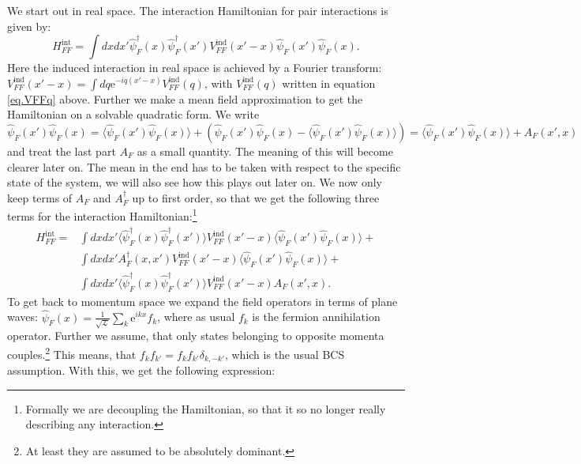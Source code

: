 We start out in real space. The interaction Hamiltonian for pair interactions is given by:
\begin{equation}
H^\text{int}_{FF} = \int dxdx' \hat{\psi}^\dagger_F(x)\hat{\psi}^\dagger_F(x')V^\text{ind}_{FF}(x'-x) \hat{\psi}_F(x') \hat{\psi}_F(x).
\label{eq.HFFintdef}
\end{equation}
Here the induced interaction in real space is achieved by a Fourier transform: $V^\text{ind}_{FF}(x'-x) = \int dq \text{e}^{-iq(x'-x)} V^\text{ind}_{FF}(q)$, with $V^\text{ind}_{FF}(q)$ written in equation \eqref{eq.VFFq} above. Further we make a mean field approximation to get the Hamiltonian on a solvable quadratic form. We write
\begin{equation}
\hat{\psi}_F(x') \hat{\psi}_F(x) = \langle \hat{\psi}_F(x') \hat{\psi}_F(x) \rangle + \left(\hat{\psi}_F(x') \hat{\psi}_F(x)-\langle \hat{\psi}_F(x') \hat{\psi}_F(x) \rangle \right) = \langle \hat{\psi}_F(x') \hat{\psi}_F(x) \rangle + A_F(x',x)
\end{equation}
and treat the last part $A_F$ as a small quantity. The meaning of this will become clearer later on. The mean in the end has to be taken with respect to the specific state of the system, we will also see how this plays out later on. We now only keep terms of $A_F$ and $A^\dagger_F$ up to first order, so that we get the following three terms for the interaction Hamiltonian:\footnote{Formally we are decoupling the Hamiltonian, so that it so no longer really describing any interaction.}
\begin{align}
H^\text{int}_{FF} = &\int dxdx' \langle \hat{\psi}^\dagger_F(x) \hat{\psi}^\dagger_F(x') \rangle V^\text{ind}_{FF}(x'-x) \langle \hat{\psi}_F(x') \hat{\psi}_F(x) \rangle + \nonumber \\
&\int dxdx' A^\dagger_F(x,x') V^\text{ind}_{FF}(x'-x) \langle \hat{\psi}_F(x') \hat{\psi}_F(x) \rangle + \nonumber \\
&\int dxdx' \langle \hat{\psi}^\dagger_F(x) \hat{\psi}^\dagger_F(x') \rangle V^\text{ind}_{FF}(x'-x) A_F(x',x). \nonumber
\end{align} 
To get back to momentum space we expand the field operators in terms of plane waves: $\hat{\psi}_F(x) = \frac{1}{\sqrt{\mathcal{L}}}\sum_k \text{e}^{ikx} f_k$, where as usual $f_k$ is the fermion annihilation operator. Further we assume, that only states belonging to opposite momenta couples.\footnote{At least they are assumed to be absolutely dominant.} This means, that $f_kf_{k'} = f_kf_{k'}\delta_{k,-k'}$, which is the usual BCS assumption. With this, we get the following expression:
